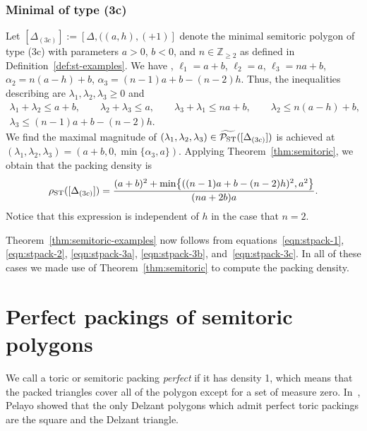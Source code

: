 \documentclass[pdftex]{sigma}
\numberwithin{equation}{section}
\def\Z{{\mathbb Z}}
\newcommand{\De}{\Delta}
\newcommand{\PSTtilde}{\widetilde{\mathcal{P}_{\rm ST}}}
\begin{document}
\subsubsection{Minimal of type (3c)}
Let $[\De_{(3c)}]:=[\De,((a,h),(+1)]$ denote the minimal semitoric polygon of type (3c) with parameters $a>0$, $b<0$, and $n\in\Z_{\geq 2}$ as defined in Definition~\ref{def:st-examples}. We have \smash{$\textrm{area}(\De) = \frac{(na+2b)a}{2}$}, $\ell_1 = a+b$, $\ell_2 = a$, $\ell_3 = na+b$, $\alpha_2 = n(a-h)+b$, $\alpha_3 = (n-1)a+b - (n-2)h$. Thus, the inequalities describing \smash{$\PSTtilde([\De_{(3c)}])$} are $\lambda_1,\lambda_2,\lambda_3\geq 0$ and
\begin{gather*}
 \lambda_1+\lambda_2 \leq a+b,\qquad
 \lambda_2+\lambda_3 \leq a,\qquad
 \lambda_3+\lambda_1 \leq na+b,\qquad
 \lambda_2 \leq n(a-h)+b,\\
 \lambda_3 \leq (n-1)a+b - (n-2)h.
\end{gather*}
We find the maximal magnitude of $(\lambda_1,\lambda_2,\lambda_3)\in\PSTtilde([\De_{(3c)}])$ is achieved at $(\lambda_1,\lambda_2,\lambda_3) = (a+b,0,\min\{\alpha_3,a\})$. Applying Theorem~\ref{thm:semitoric}, we obtain that the packing density is
\begin{equation}\label{eqn:stpack-3c}
\rho_{{\rm ST}} ([\De_{(3c)}]) = \frac{(a+b)^2+\min\bigl\{ ((n-1)a+b - (n-2)h )^2,a^2\bigr\}}{(na+2b)a}.
\end{equation}
Notice that this expression is independent of $h$ in the case that $n=2$.



Theorem~\ref{thm:semitoric-examples} now
follows from equations~\eqref{eqn:stpack-1}, \eqref{eqn:stpack-2}, \eqref{eqn:stpack-3a}, \eqref{eqn:stpack-3b}, and~\eqref{eqn:stpack-3c}.
In all of these cases we made use of Theorem~\ref{thm:semitoric} to compute the packing density.






\section{Perfect packings of semitoric polygons}
\label{sec:perfect}

We call a toric or semitoric packing \emph{perfect} if it has density 1, which means that the packed triangles cover all of the polygon except for a set of measure zero.
In~\cite{Pe2006}, Pelayo showed that the only Delzant polygons which admit perfect toric packings are the square and the Delzant triangle.
\end{document}
